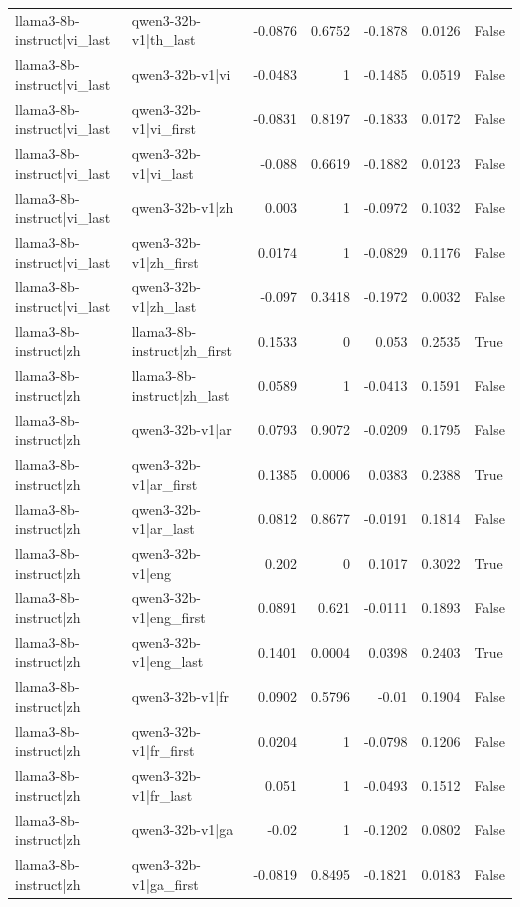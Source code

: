\begin{table}
\begin{tabular}{l l r r r r l}
llama3-8b-instruct|vi_last & qwen3-32b-v1|th_last & -0.0876 & 0.6752 & -0.1878 & 0.0126 & False \\
llama3-8b-instruct|vi_last & qwen3-32b-v1|vi & -0.0483 & 1 & -0.1485 & 0.0519 & False \\
llama3-8b-instruct|vi_last & qwen3-32b-v1|vi_first & -0.0831 & 0.8197 & -0.1833 & 0.0172 & False \\
llama3-8b-instruct|vi_last & qwen3-32b-v1|vi_last & -0.088 & 0.6619 & -0.1882 & 0.0123 & False \\
llama3-8b-instruct|vi_last & qwen3-32b-v1|zh & 0.003 & 1 & -0.0972 & 0.1032 & False \\
llama3-8b-instruct|vi_last & qwen3-32b-v1|zh_first & 0.0174 & 1 & -0.0829 & 0.1176 & False \\
llama3-8b-instruct|vi_last & qwen3-32b-v1|zh_last & -0.097 & 0.3418 & -0.1972 & 0.0032 & False \\
llama3-8b-instruct|zh & llama3-8b-instruct|zh_first & 0.1533 & 0 & 0.053 & 0.2535 & True \\
llama3-8b-instruct|zh & llama3-8b-instruct|zh_last & 0.0589 & 1 & -0.0413 & 0.1591 & False \\
llama3-8b-instruct|zh & qwen3-32b-v1|ar & 0.0793 & 0.9072 & -0.0209 & 0.1795 & False \\
llama3-8b-instruct|zh & qwen3-32b-v1|ar_first & 0.1385 & 0.0006 & 0.0383 & 0.2388 & True \\
llama3-8b-instruct|zh & qwen3-32b-v1|ar_last & 0.0812 & 0.8677 & -0.0191 & 0.1814 & False \\
llama3-8b-instruct|zh & qwen3-32b-v1|eng & 0.202 & 0 & 0.1017 & 0.3022 & True \\
llama3-8b-instruct|zh & qwen3-32b-v1|eng_first & 0.0891 & 0.621 & -0.0111 & 0.1893 & False \\
llama3-8b-instruct|zh & qwen3-32b-v1|eng_last & 0.1401 & 0.0004 & 0.0398 & 0.2403 & True \\
llama3-8b-instruct|zh & qwen3-32b-v1|fr & 0.0902 & 0.5796 & -0.01 & 0.1904 & False \\
llama3-8b-instruct|zh & qwen3-32b-v1|fr_first & 0.0204 & 1 & -0.0798 & 0.1206 & False \\
llama3-8b-instruct|zh & qwen3-32b-v1|fr_last & 0.051 & 1 & -0.0493 & 0.1512 & False \\
llama3-8b-instruct|zh & qwen3-32b-v1|ga & -0.02 & 1 & -0.1202 & 0.0802 & False \\
llama3-8b-instruct|zh & qwen3-32b-v1|ga_first & -0.0819 & 0.8495 & -0.1821 & 0.0183 & False \\

\end{tabular}
\end{table}
